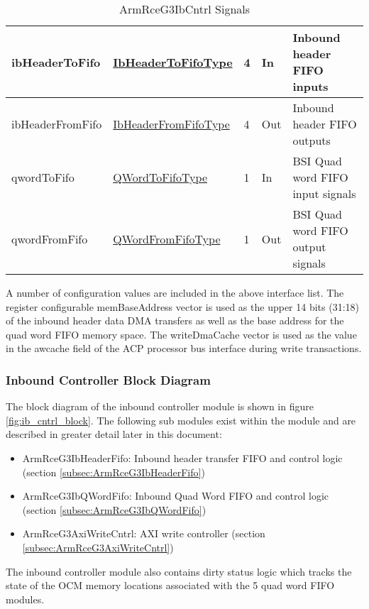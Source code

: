 \documentclass[11pt]{article}
\begin{document}
\begin{table}[H]
\begin{tabular}{| l | l | l | l | l | }
      \hline ibHeaderToFifo             & \hyperref[subsec:IbHeaderToFifoType]{IbHeaderToFifoType}   & 4 & In        & Inbound header FIFO inputs    \\
      \hline ibHeaderFromFifo           & \hyperref[subsec:IbHeaderFromFifoType]{IbHeaderFromFifoType} & 4 & Out      & Inbound header FIFO outputs   \\
      \hline qwordToFifo                & \hyperref[subsec:QWordToFifoType]{QWordToFifoType}         & 1   & In       & BSI Quad word FIFO input signals  \\
      \hline qwordFromFifo              & \hyperref[subsec:QWordFromFifoType]{QWordFromFifoType}     & 1   & Out      & BSI Quad word FIFO output signals \\
      \hline
   \end{tabular}
   \caption{ArmRceG3IbCntrl Signals}
   \label{tab:ib_cntrl_signals}
\end{table}

A number of configuration values are included in the above interface list. The register configurable memBaseAddress vector is used as the upper 
14 bits (31:18) of the inbound header data DMA transfers as well as the base address for the quad word FIFO memory space. The writeDmaCache vector
is used as the value in the awcache field of the ACP processor bus interface during write transactions.

\subsubsection{Inbound Controller Block Diagram}

The block diagram of the inbound controller module is shown in figure \ref{fig:ib_cntrl_block}. The following sub modules
exist within the module and are described in greater detail later in this document:

\begin{itemize}
   \item ArmRceG3IbHeaderFifo: Inbound header transfer FIFO and control logic (section \ref{subsec:ArmRceG3IbHeaderFifo})
   \item ArmRceG3IbQWordFifo: Inbound Quad Word FIFO and control logic (section \ref{subsec:ArmRceG3IbQWordFifo})
   \item ArmRceG3AxiWriteCntrl: AXI write controller (section \ref{subsec:ArmRceG3AxiWriteCntrl})
\end{itemize}

The inbound controller module also contains dirty status logic which tracks the state of the OCM memory locations associated
with the 5 quad word FIFO modules.
\end{document}
